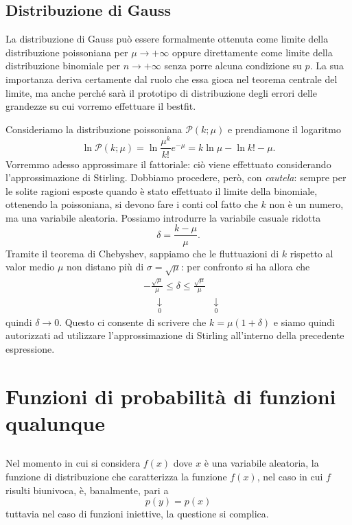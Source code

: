 \documentclass{report}
\begin{document}
\section{Distribuzione di Gauss}
La distribuzione di Gauss può essere formalmente ottenuta come limite della distribuzione poissoniana per $\mu \to +\infty$ oppure direttamente come limite della distribuzione binomiale per $n \to +\infty$ senza porre alcuna condizione su $p$. La sua importanza deriva certamente dal ruolo che essa gioca nel teorema centrale del limite, ma anche perché sarà il prototipo di distribuzione degli errori delle grandezze su cui vorremo effettuare il bestfit. 
\begin{myproof}
	Consideriamo la distribuzione poissoniana $\mathcal{P}(k; \mu)$ e prendiamone il logaritmo
	$$
		\ln{\mathcal{P}(k; \mu)} = \ln{\frac{\mu^k}{k!}e^{-\mu}} = k \ln{\mu} - \ln{k!} - \mu.
	$$
	Vorremmo adesso approssimare il fattoriale: ciò viene effettuato considerando l'approssimazione di Stirling. Dobbiamo procedere, però, con \emph{cautela}: sempre per le solite ragioni esposte quando è stato effettuato il limite della binomiale, ottenendo la poissoniana, si devono fare i conti col fatto che $k$ non è un numero, ma una variabile aleatoria. Possiamo introdurre la variabile casuale ridotta
	$$
		\delta = \frac{k-\mu}{\mu}.
	$$
	Tramite il teorema di Chebyshev, sappiamo che le fluttuazioni di $k$ rispetto al valor medio $\mu$ non distano più di $\sigma = \sqrt{\mu}$: per confronto si ha allora che
	\[
	\begin{aligned}
    	&-\frac{\sqrt{\mu}}{\mu} \leq \delta \leq \frac{\sqrt{\mu}}{\mu} \\
    	&\, \, \, \, \, \, \, \underset{0}{\downarrow} \phantom{\leq \leq} \, \, \, \, \, \, \, \, \, \, \, \, \,\underset{0}{\downarrow}
	\end{aligned}
	\]
	quindi $\delta \to 0$. Questo ci consente di scrivere che $k = \mu(1 + \delta)$ e siamo quindi autorizzati ad utilizzare l'approssimazione di Stirling all'interno della precedente espressione.
\end{myproof}





\chapter{Funzioni di probabilità di funzioni qualunque}
\section{}
Nel momento in cui si considera $f(x)$ dove $x$ è una variabile aleatoria, la funzione di distribuzione che caratterizza la funzione $f(x)$, nel caso in cui $f$ risulti biunivoca, è, banalmente, pari a
$$
	p(y)=p(x)
$$
tuttavia nel caso di funzioni iniettive, la questione si complica.
\pagebreak
\printindex
\end{document}
